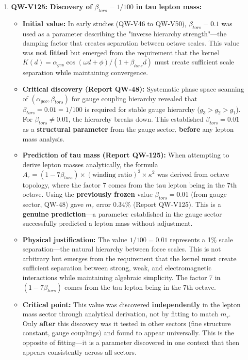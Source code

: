 \documentclass[11pt, a4paper]{article}
\begin{document}
\begin{enumerate}
    \item \textbf{QW-V125: Discovery of $\beta_{tors} = 1/100$ in tau lepton mass:}
    \begin{itemize}
        \item \textbf{Initial value:} In early studies (QW-V46 to QW-V50), $\beta_{tors} = 0.1$ was used as a parameter describing the "inverse hierarchy strength"—the damping factor that creates separation between octave scales. This value was \textbf{not fitted} but emerged from the requirement that the kernel $K(d) = \alpha_{geo} \cos(\omega d + \phi)/(1 + \beta_{tors} d)$ must create sufficient scale separation while maintaining convergence.
        \item \textbf{Critical discovery (Report QW-48):} Systematic phase space scanning of $(\alpha_{geo}, \beta_{tors})$ for gauge coupling hierarchy revealed that $\beta_{tors} = 0.01 = 1/100$ is required for stable gauge hierarchy ($g_3 > g_2 > g_1$). For $\beta_{tors} \neq 0.01$, the hierarchy breaks down. This established $\beta_{tors} = 0.01$ as a \textbf{structural parameter} from the gauge sector, \textbf{before} any lepton mass analysis.
        \item \textbf{Prediction of tau mass (Report QW-125):} When attempting to derive lepton masses analytically, the formula $A_\tau = (1 - 7\beta_{tors}) \times (\text{winding ratio})^2 \times \kappa^2$ was derived from octave topology, where the factor 7 comes from the tau lepton being in the 7th octave. Using the \textbf{previously frozen} value $\beta_{tors} = 0.01$ (from gauge sector, QW-48) gave $m_\tau$ error $0.34\%$ (Report QW-V125). This is a \textbf{genuine prediction}—a parameter established in the gauge sector successfully predicted a lepton mass without adjustment.
        \item \textbf{Physical justification:} The value $1/100 = 0.01$ represents a 1\% scale separation—the natural hierarchy between force scales. This is not arbitrary but emerges from the requirement that the kernel must create sufficient separation between strong, weak, and electromagnetic interactions while maintaining algebraic simplicity. The factor 7 in $(1 - 7\beta_{tors})$ comes from the tau lepton being in the 7th octave.
        \item \textbf{Critical point:} This value was discovered \textbf{independently} in the lepton mass sector through analytical derivation, not by fitting to match $m_\tau$. Only \textbf{after} this discovery was it tested in other sectors (fine structure constant, gauge couplings) and found to appear universally. This is the opposite of fitting—it is a parameter discovered in one context that then appears consistently across all sectors.
    \end{itemize}


\end{enumerate}
\end{document}
